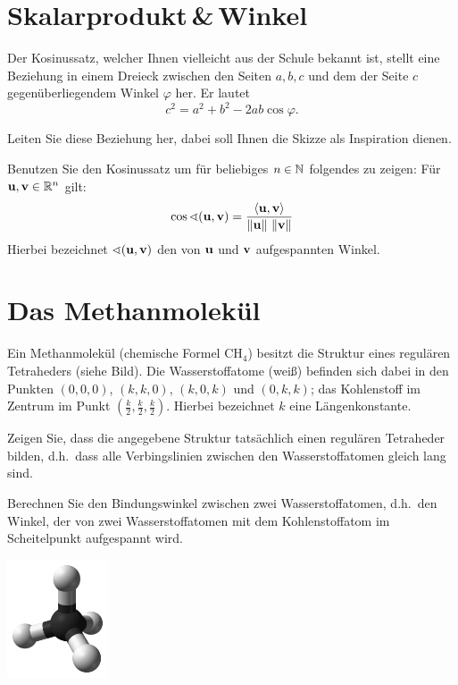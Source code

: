 \documentclass{scrartcl}
\newcommand{\uu}{\mat u}
\newcommand{\vv}{\mat v}
\begin{document}
\section{Skalarprodukt\,\&\,Winkel}
Der Kosinussatz, welcher Ihnen vielleicht aus der Schule bekannt ist, stellt eine Beziehung in einem Dreieck zwischen den Seiten $a,b,c$ und dem der Seite $c$ gegenüberliegendem Winkel $\varphi$ her.
Er lautet
  \[
  c^2=a^2+b^2-2ab\cos \varphi.
  \]
\begin{subex}
  \item Leiten Sie diese Beziehung her, dabei soll Ihnen die Skizze als Inspiration dienen.
  \item Benutzen Sie den Kosinussatz um für beliebiges $n \in \mathbb{N}$ folgendes zu zeigen: Für $\uu, \vv \in \RR^n$ gilt:
  \[
    \cos \sphericalangle(\uu,\vv) = \frac{\sp{\uu}{\vv}}{\norm{\uu}\,\norm{\vv}}
  \] 
  Hierbei bezeichnet $\sphericalangle(\uu,\vv)$ den von $\uu$ und $\vv$ aufgespannten Winkel.
\end{subex}

\begin{center}
\end{center}


\section{Das Methanmolekül}
Ein Methanmolekül (chemische Formel $\mathrm{CH}_4$) besitzt die Struktur eines regulären Tetraheders (siehe Bild).
Die Wasserstoffatome (weiß) befinden sich dabei in den Punkten $(0,0,0)$, $(k,k,0)$, $(k,0,k)$ und $(0,k,k)$; das Kohlenstoff im Zentrum im Punkt $(\frac{k}{2},\frac{k}{2},\frac{k}{2})$.
Hierbei bezeichnet $k$ eine Längenkonstante.
\begin{subex}
  \item Zeigen Sie, dass die angegebene Struktur tatsächlich einen regulären Tetraheder bilden, d.h.\ dass alle Verbingslinien zwischen den Wasserstoffatomen gleich lang sind.
  \item Berechnen Sie den Bindungswinkel zwischen zwei Wasserstoffatomen, d.h.\ den Winkel, der von zwei Wasserstoffatomen mit dem Kohlenstoffatom im Scheitelpunkt aufgespannt wird.
\end{subex}

\begin{center}
  \includegraphics[width=3cm]{img/methan.png}
\end{center}


 
\end{document}
